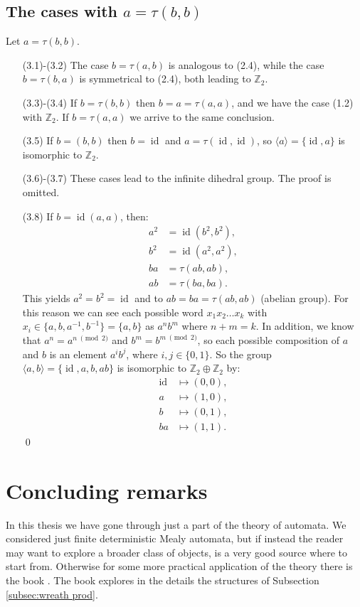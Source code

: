 \documentclass[mat1]{fmfdeloTS2.0}
\newcommand{\Z}{\mathbb Z}
\DeclareMathOperator{\id}{\mathrm{id}}			%
\begin{document}
\subsection{The cases with \texorpdfstring{$a=\tau(b,b)$}{}}

Let $a=\tau(b,b)$.
\begin{itemize}
\item[(3.1)-(3.2)] The case $b=\tau(a,b)$ is analogous to (2.4), while the case $b=\tau(b,a)$ is symmetrical to (2.4), both leading to $\Z_2$.
\item[(3.3)-(3.4)] If $b=\tau(b,b)$ then $b=a=\tau(a,a)$, and we have the case (1.2) with $\Z_2$. If $b=\tau(a,a)$ we arrive to the same conclusion.
\item[(3.5)] If $b=(b,b)$ then $b=\id$ and $a=\tau(\id,\id)$, so $\langle a\rangle =\{\id,a\}$ is isomorphic to $\Z_2$.
\item[(3.6)-(3.7)] These cases lead to the infinite dihedral group. The proof is omitted.
\item[(3.8)] If $b=\id(a,a)$, then:
\begin{align*}
a^2&=\id(b^2,b^2),\\
b^2&=\id(a^2,a^2),\\
 ba&=\tau(ab,ab),\\
 ab&=\tau(ba,ba).
\end{align*}
This yields $a^2=b^2=\id$ and to $ab=ba=\tau(ab,ab)$ (abelian group). For this reason we can see each possible word $x_1x_2\ldots x_k$ with $x_i\in\{a,b,a^{-1},b^{-1}\}=\{a,b\}$ as $a^nb^m$ where $n+m=k$. In addition, we know that $a^n=a^{n\;\pmod 2}$ and $b^m=b^{m\;\pmod 2}$, so each possible composition of $a$ and $b$ is an element $a^ib^j$, where $i,j\in\{0,1\}$. So the group $\langle a,b\rangle =\{\id,a,b,ab\}$ is isomorphic to $\Z_2\oplus\Z_2$ by:
\begin{align*}
\id&\longmapsto (0,0),\\
a&\longmapsto (1,0),\\
b&\longmapsto (0,1),\\
ba&\longmapsto (1,1). 
\end{align*}\qed
\end{itemize}



\bigskip
\appendix
\section*{Concluding remarks}

In this thesis we have gone through just a part of the theory of automata. We considered just finite deterministic Mealy automata, but if instead the reader may want to explore a broader class of objects, \cite{4} is a very good source where to start from. Otherwise for some more practical application of the theory there is the book \cite{11}. The book \cite{9} explores in the details the structures of Subsection \ref{subsec:wreath prod}.
\end{document}
